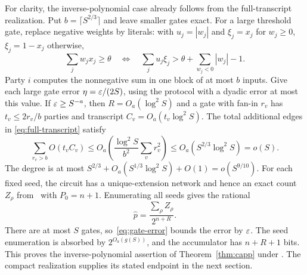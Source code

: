 For clarity, the inverse-polynomial case already follows from the
full-transcript realization. Put $b=\lceil S^{2/3}\rceil$ and leave
smaller gates exact. For a large threshold gate, replace negative
weights by literals: with $u_j=|w_j|$ and
$\xi_j=x_j$ for $w_j\ge0$, $\xi_j=1-x_j$ otherwise,
\[
 \sum_jw_jx_j\ge\theta
 \quad\Longleftrightarrow\quad
 \sum_j u_j\xi_j>\theta+\sum_{w_j<0}|w_j|-1.
\]
Party $i$ computes the nonnegative sum in one block of at most $b$
inputs. Give each large gate error $\eta=\varepsilon/(2S)$, using the
protocol with a dyadic error at most this value. If $\varepsilon\ge S^{-a}$,
then $R=O_a(\log^2S)$ and a gate with fan-in $r_v$ has
$t_v\le2r_v/b$ parties and transcript
$C_v=O_a(t_v\log^2S)$. The total additional edges in
\eqref{eq:full-transcript} satisfy
\[
 \sum_{r_v>b}O(t_vC_v)
 \le O_a\left(\frac{\log^2S}{b^2}\sum_vr_v^2\right)
 \le O_a(S^{2/3}\log^2S)=o(S).
\]
The degree is at most
$S^{2/3}+O_a(S^{1/3}\log^2S)+O(1)=o(S^{9/10})$.
For each fixed seed, the circuit has a unique-extension network and
hence an exact count $Z_\rho$ from \HTC\ with $P_0=n+1$.
Enumerating all seeds gives the rational
\begin{equation}\label{eq:capp-output}
 \widehat p=\frac{\sum_\rho Z_\rho}{2^{n+R}}.
\end{equation}
There are at most $S$ gates, so~\eqref{eq:gate-error} bounds the
error by $\varepsilon$. The seed enumeration is absorbed by
$2^{O_a(g(S))}$, and the accumulator has $n+R+1$ bits. This proves
the inverse-polynomial assertion of Theorem~\ref{thm:capp} under
\HTC. The compact realization supplies its stated endpoint in the
next section.
